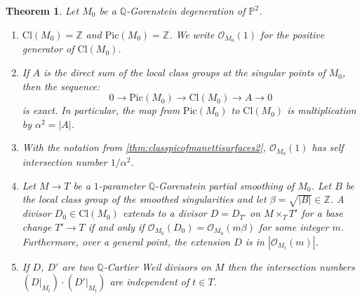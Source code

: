 \documentclass[JEP,XML,SOM,Unicode,NoFloatCountersInSection,published]{cedram}
\theoremstyle{plain}
\newtheorem{theorem}{Theorem}[section]
\theoremstyle{definition}
\newcommand\PP{{\mathbb{P}}}
\newcommand\QQ{{\mathbb Q}}
\newcommand\ZZ{{\mathbb Z}}
\newcommand\Oc{{\mathcal O}}
\newcommand\Cl{{\mathrm{Cl}}}
\newcommand\Pic{{\mathrm{Pic}}}
\begin{document}
\begin{theorem}\label{thm:classpicofmanettisurfaces} Let $M_0$ be a $\QQ$-Gorenstein degeneration of $\PP^2$.
\begin{enumerate}
\item\label{thm:classpicofmanettisurfaces1}
$\Cl(M_0)=\ZZ$ and $\Pic(M_0)=\ZZ$. We write $\Oc_{M_0}(1)$ for the positive generator of $\Cl(M_0)$.
\item\label{thm:classpicofmanettisurfaces2}
If $A$ is the direct sum of the local class groups at the singular points of $M_0$, then the sequence:
\[
0\to \Pic(M_0)\to \Cl(M_0)\to A\to 0
\]
is exact. In particular, the map from $\Pic(M_0)$ to $\Cl(M_0)$ is multiplication by $\alpha^2=|A|$.
\item\label{thm:classpicofmanettisurfaces3}
With the notation from \eqref{thm:classpicofmanettisurfaces2}, $\Oc_{M_0}(1)$ has self intersection number $1/\alpha^2$.
\item\label{thm:classpicofmanettisurfaces4}
Let $M \to T$ be a $1$-parameter $\QQ$-Gorenstein partial smoothing of $M_0$. Let $B$ be the local class group of the smoothed singularities and let $\beta=\sqrt{|B|}\in \ZZ$. A divisor $D_0\in \Cl(M_0)$ extends to a divisor $D = D_{T'}$ on $M \times_T T'$ for a base change $T' \to T$ if and only if $\Oc_{M_0}(D_0) = \Oc_{M_0}(m \beta)$ for some integer $m$. Furthermore, over a general point, the extension $D$ is in $|\Oc_{M_t}(m)|$.
\item\label{thm:classpicofmanettisurfaces5}
If $D$, $D'$ are two $\QQ$-Cartier Weil divisors on $M$ then the intersection numbers $(D|_{M_t})\cdot (D'|_{M_t})$ are independent of $t\in T$.
\end{enumerate}
\end{theorem}
\end{document}
